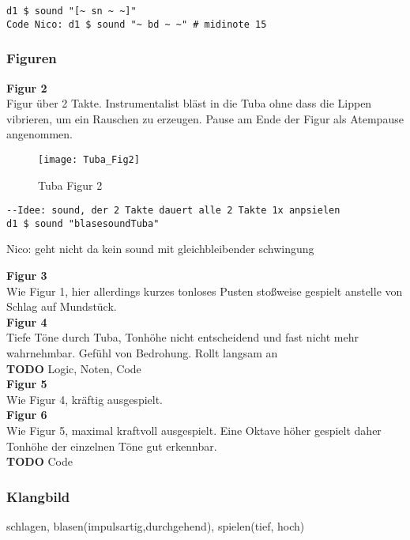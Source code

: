 \documentclass[
10pt, %
a4paper, %
oneside, %
headinclude,footinclude, %
BCOR5mm, %
]{scrartcl}
\begin{document}
\begin{lstlisting}
d1 $ sound "[~ sn ~ ~]"
Code Nico: d1 $ sound "~ bd ~ ~" # midinote 15
\end{lstlisting}

\subsubsection{Figuren}
\textbf{Figur 2}\\
Figur über 2 Takte. Instrumentalist bläst in die Tuba ohne dass die Lippen vibrieren, um ein Rauschen zu erzeugen. Pause am Ende der Figur als Atempause angenommen. 

\begin{figure}[h]
	\centering 
	\texttt{[image: Tuba\_Fig2]} 
	\caption{Tuba Figur 2}
\end{figure}

\begin{lstlisting}
--Idee: sound, der 2 Takte dauert alle 2 Takte 1x anpsielen
d1 $ sound "blasesoundTuba"
\end{lstlisting}

Nico: geht nicht da kein sound mit gleichbleibender schwingung

\noindent\textbf{Figur 3}\\
Wie Figur 1, hier allerdings kurzes tonloses Pusten stoßweise gespielt anstelle von Schlag auf Mundstück.\\

\noindent\textbf{Figur 4}\\
Tiefe Töne durch Tuba, Tonhöhe nicht entscheidend und fast nicht mehr wahrnehmbar. Gefühl von Bedrohung. Rollt langsam an\\
{\color{red}\textbf{TODO}} Logic, Noten, Code\\

\noindent\textbf{Figur 5}\\
Wie Figur 4, kräftig ausgespielt.\\

\noindent\textbf{Figur 6}\\
Wie Figur 5, maximal kraftvoll ausgespielt. Eine Oktave höher gespielt daher Tonhöhe der einzelnen Töne gut erkennbar.\\
{\color{red}\textbf{TODO}} Code

\subsubsection{Klangbild}
schlagen, blasen(impulsartig,durchgehend), spielen(tief, hoch)
\end{document}
